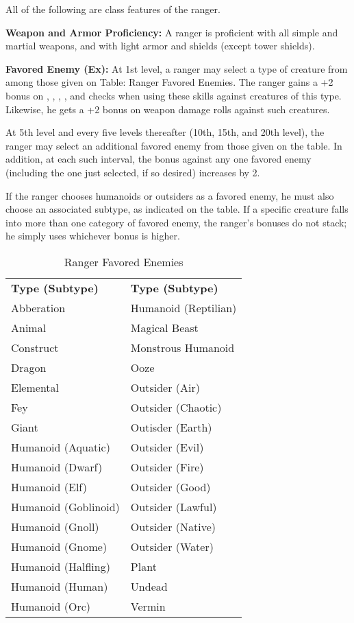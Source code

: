 All of the following are class features of the ranger.

\textbf{Weapon and Armor Proficiency:} A ranger is proficient with all simple and 
martial weapons, and with light armor and shields (except tower shields).

\textbf{Favored Enemy (Ex):} At 1st level, a ranger may select a type of creature 
from among those given on Table: Ranger Favored Enemies. The ranger gains a +2 
bonus on , , , , and  checks when using these 
skills against creatures of this type. Likewise, he gets a +2 bonus on weapon damage 
rolls against such creatures.

At 5th level and every five levels thereafter (10th, 15th, and 20th level), the 
ranger may select an additional favored enemy from those given on the table. In 
addition, at each such interval, the bonus against any one favored enemy (including 
the one just selected, if so desired) increases by 2. 

If the ranger chooses humanoids or outsiders as a favored enemy, he must also choose 
an associated subtype, as indicated on the table. If a specific creature falls 
into more than one category of favored enemy, the ranger's bonuses do not stack; 
he simply uses whichever bonus is higher.

\begin{table}[htb]
\caption{Ranger Favored Enemies}
\centering
\begin{tabular}{l l}
\textbf{Type (Subtype)} & \textbf{Type (Subtype)}\\
Abberation & Humanoid (Reptilian)\\
Animal & Magical Beast\\
Construct & Monstrous Humanoid\\
Dragon & Ooze\\
Elemental & Outsider (Air)\\
Fey & Outsider (Chaotic)\\
Giant & Outisder (Earth)\\
Humanoid (Aquatic) & Outsider (Evil)\\
Humanoid (Dwarf) & Outsider (Fire)\\
Humanoid (Elf) & Outsider (Good)\\
Humanoid (Goblinoid) & Outsider (Lawful)\\
Humanoid (Gnoll) & Outsider (Native)\\
Humanoid (Gnome) & Outsider (Water)\\
Humanoid (Halfling) & Plant\\
Humanoid (Human) & Undead\\
Humanoid (Orc) & Vermin\\
\end{tabular}
\end{table}

